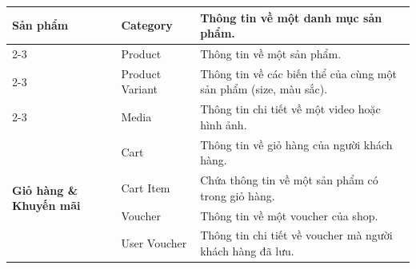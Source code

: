 \begin{table}[H]
\begin{tabular}{|m{3cm}|m{3.5cm}|m{9.5cm}|}
		\multirow{4}{=}{\textbf{Sản phẩm}}
		                   & Category              & Thông tin về một danh mục sản phẩm.                                                                                                  \\ \cline{2-3}
		                   & Product               & Thông tin về một sản phẩm.                                                                                                           \\ \cline{2-3}
		                   & Product Variant       & Thông tin về các biến thể của cùng một sản phẩm (size, màu sắc).                                                                     \\ \cline{2-3}
		                   & Media                 & Thông tin chi tiết về một video hoặc hình ảnh.                                                                                       \\ \hline

		\multirow{4}{=}{\textbf{Giỏ hàng \& Khuyến mãi}}
		                   & Cart                  & Thông tin về giỏ hàng của người khách hàng.                                                                                          \\ \cline{2-3}
		                   & Cart Item             & Chứa thông tin về một sản phẩm có trong giỏ hàng.                                                                                    \\ \cline{2-3}
		                   & Voucher               & Thông tin về một voucher của shop.                                                                                                   \\ \cline{2-3}
		                   & User Voucher          & Thông tin chi tiết về voucher mà người khách hàng đã lưu.                                                                            \\ \hline


\end{tabular}
\end{table}
